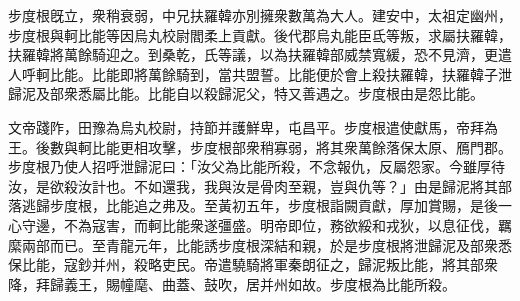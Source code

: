 \begin{pinyinscope}
 步度根旣立，衆稍衰弱，中兄扶羅韓亦別擁衆數萬為大人。建安中，太祖定幽州，步度根與軻比能等因烏丸校尉閻柔上貢獻。後代郡烏丸能臣氐等叛，求屬扶羅韓，扶羅韓將萬餘騎迎之。到桑乾，氏等議，以為扶羅韓部威禁寬緩，恐不見濟，更遣人呼軻比能。比能即將萬餘騎到，當共盟誓。比能便於會上殺扶羅韓，扶羅韓子泄歸泥及部衆悉屬比能。比能自以殺歸泥父，特又善遇之。步度根由是怨比能。
 
 
 
 
 文帝踐阼，田豫為烏丸校尉，持節并護鮮卑，屯昌平。步度根遣使獻馬，帝拜為王。後數與軻比能更相攻擊，步度根部衆稍寡弱，將其衆萬餘落保太原、鴈門郡。步度根乃使人招呼泄歸泥曰：「汝父為比能所殺，不念報仇，反屬怨家。今雖厚待汝，是欲殺汝計也。不如還我，我與汝是骨肉至親，豈與仇等？」由是歸泥將其部落逃歸步度根，比能追之弗及。至黃初五年，步度根詣闕貢獻，厚加賞賜，是後一心守邊，不為寇害，而軻比能衆遂彊盛。明帝即位，務欲綏和戎狄，以息征伐，羈縻兩部而已。至青龍元年，比能誘步度根深結和親，於是步度根將泄歸泥及部衆悉保比能，寇鈔并州，殺略吏民。帝遣驍騎將軍秦朗征之，歸泥叛比能，將其部衆降，拜歸義王，賜幢麾、曲蓋、鼓吹，居并州如故。步度根為比能所殺。
 
 
\end{pinyinscope}